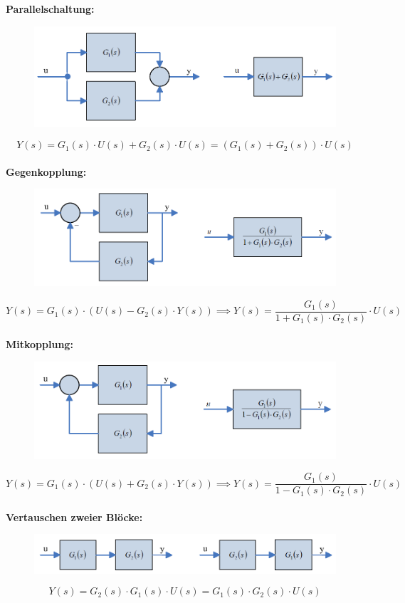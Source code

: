 \documentclass[10pt,a4paper]{article}
\begin{document}
\textbf{Parallelschaltung:}
\begin{figure}[H]
	\includegraphics[width = \columnwidth]{imgs/parallelschaltung.png}
\end{figure}
$$
	Y(s) = G_1(s) ⋅ U(s) + G_2(s) ⋅ U(s) = (G_1(s) + G_2(s)) ⋅ U(s)
$$ \\

\textbf{Gegenkopplung:}
\begin{figure}[H]
	\includegraphics[width = \columnwidth]{imgs/gegenkopplung.png}
\end{figure}
$$
	Y(s) = G_1(s) ⋅ (U(s) - G_2(s) ⋅ Y(s)) \implies Y(s) = \frac{G_1(s)}{1 + G_1(s) ⋅ G_2(s)} ⋅ U(s)
$$ \\

\textbf{Mitkopplung:}
\begin{figure}[H]
	\includegraphics[width = \columnwidth]{imgs/mitkopplung.png}
\end{figure}
$$
	Y(s) = G_1(s) ⋅ (U(s) + G_2(s) ⋅ Y(s)) \implies Y(s) = \frac{G_1(s)}{1 - G_1(s) ⋅ G_2(s)} ⋅ U(s)
$$ \\

\textbf{Vertauschen zweier Blöcke:}
\begin{figure}[H]
	\includegraphics[width = \columnwidth]{imgs/vertauschen_zweier_bloecke.png}
\end{figure}
$$
	Y(s) = G_2(s) ⋅ G_1(s) ⋅ U(s) = G_1(s) ⋅ G_2(s) ⋅ U(s)
$$ \\
\end{document}

